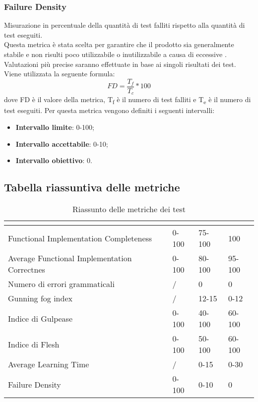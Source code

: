 \subsubsection{Failure Density}
Misurazione in percentuale della quantità di test falliti rispetto alla quantità di test eseguiti.
\\Questa metrica è stata scelta per garantire che il prodotto sia generalmente stabile e non risulti poco utilizzabile o inutilizzabile a causa di eccessive . Valutazioni più precise saranno effettuate in base ai singoli risultati dei test.\\
Viene utilizzata la seguente formula:
$$FD=\frac{T_f}{T_c}*100$$
dove FD è il valore della metrica, T\textsubscript{f} è il numero di test falliti e T\textsubscript{e} è il numero di test eseguiti.
Per questa metrica vengono definiti i seguenti intervalli: 
\begin{itemize}
	\item{\textbf{Intervallo limite}: 0-100;}
	\item{\textbf{Intervallo accettabile}: 0-10;}
	\item{\textbf{Intervallo obiettivo}: 0.}
\end{itemize}
\subsection{Tabella riassuntiva delle metriche}
\renewcommand{\arraystretch}{1.5}
\begin{table}[H]
	\centering
	\begin{tabular}{|C{4cm}|C{3cm}|C{3cm}|C{3cm}|}
		\hline
		\textbf{\color{title_text}{Nome Metrica}} & \textbf{\color{title_text}{Intervallo limite}} & \textbf{\color{title_text}{Range accettabile}} & \textbf{\color{title_text}{Range ottimale}} \\ \hline
		Functional Implementation Completeness & 0-100 & 75-100 & 100 \\ \hline
		Average Functional Implementation Correctnes&0-100&80-100&95-100 \\ \hline
		Numero di errori grammaticali & / & 0 & 0 \\ \hline
		Gunning fog index & / &12-15&0-12 \\ \hline
		Indice di Gulpease & 0-100& 40-100& 60-100 \\ \hline
		Indice di Flesh& 0-100 & 50-100& 60-100\\ \hline
		Average Learning Time& / &0-15 & 0-30 \\ \hline
		Failure Density&0-100&0-10&0\\ \hline
	\end{tabular}
	\caption{Riassunto delle metriche dei test}
	\label{tabella:riassunto metriche dei test}
\end{table}
\renewcommand{\arraystretch}{1}
\pagebreak
